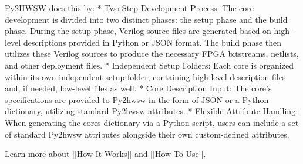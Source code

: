%

Py2HWSW does this by:
* Two-Step Development Process: The core development is divided into two distinct phases: the setup phase and the build phase. During the setup phase, Verilog source files are generated based on high-level descriptions provided in Python or JSON format. The build phase then utilizes these Verilog sources to produce the necessary FPGA bitstreams, netlists, and other deployment files.
* Independent Setup Folders: Each core is organized within its own independent setup folder, containing high-level description files and, if needed, low-level files as well.
* Core Description Input: The core's specifications are provided to Py2hwsw in the form of JSON or a Python dictionary, utilizing standard Py2hwsw attributes.
* Flexible Attribute Handling: When generating the cores dictionary via a Python script, users can include a set of standard Py2hwsw attributes alongside their own custom-defined attributes.

Learn more about [[How It Works]] and [[How To Use]].
